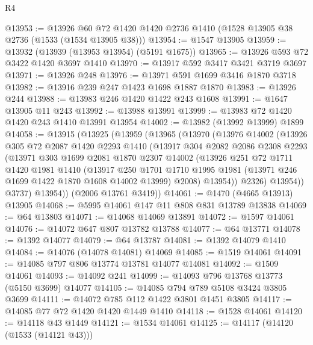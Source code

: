 \begin{lexlean}{R4}
\begin{coremodule}
@13953 := @13926 @60 @72 @1420 @1420 @2736 @1410 (@1528 @13905 @38 @2736 (@1533 (@1534 @13905 @38)))
@13954 := @1547 @13905
@13959 := @13932 (@13939 (@13953 @13954) (@5191 @1675))
@13965 := @13926 @593 @72 @3422 @1420 @3697 @1410
@13970 := @13917 @592 @3417 @3421 @3719 @3697
@13971 := @13926 @248
@13976 := @13971 @591 @1699 @3416 @1870 @3718
@13982 := @13916 @239 @247 @1423 @1698 @1887 @1870
@13983 := @13926 @244
@13988 := @13983 @246 @1420 @1422 @243 @1608
@13991 := @1647 @13905 @11 @243
@13992 := @13988 @13991
@13999 := @13983 @72 @1420 @1420 @243 @1410 @13991 @13954
@14002 := @13982 (@13992 @13999) @1899
@14058 := @13915
    (@13925
      (@13959
        (@13965
          (@13970
            (@13976
              @14002
              (@13926
                @305
                @72
                @2087
                @1420
                @2293
                @1410
                (@13917
                  @304
                  @2082
                  @2086
                  @2308
                  @2293
                  (@13971
                    @303
                    @1699
                    @2081
                    @1870
                    @2307
                    @14002
                    (@13926
                      @251
                      @72
                      @1711
                      @1420
                      @1981
                      @1410
                      (@13917
                        @250
                        @1701
                        @1710
                        @1995
                        @1981
                        (@13971 @246 @1699 @1422 @1870 @1608 @14002 @13999)
                        @2008)
                      @13954))
                  @2326)
                @13954))
            @3737)
          @13954))
      (@2006 @13761 @3419))
@14061 := @1470 (@4665 @13913) @13905
@14068 := @5995 @14061 @147 @11 @808 @831 @13789 @13838
@14069 := @64 @13803
@14071 := @14068 @14069 @13891
@14072 := @1597 @14061
@14076 := @14072 @647 @807 @13782 @13788
@14077 := @64 @13771
@14078 := @1392 @14077
@14079 := @64 @13787
@14081 := @1392 @14079 @1410
@14084 := @14076 (@14078 @14081) @14069
@14085 := @1519 @14061
@14091 := @14085 @797 @806 @13774 @13781 @14077 @14081
@14092 := @1509 @14061
@14093 := @14092 @241
@14099 := @14093 @796 @13768 @13773 (@5150 @3699) @14077
@14105 := @14085 @794 @789 @5108 @3424 @3805 @3699
@14111 := @14072 @785 @112 @1422 @3801 @1451 @3805
@14117 := @14085 @77 @72 @1420 @1420 @1449 @1410
@14118 := @1528 @14061
@14120 := @14118 @43 @1449
@14121 := @1534 @14061
@14125 := @14117 (@14120 (@1533 (@14121 @43)))

\end{coremodule}
\end{lexlean}
